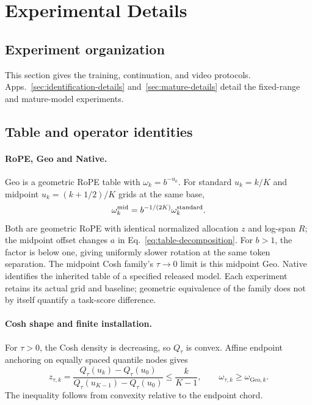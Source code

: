 \section{Experimental Details}
\label{sec:experiment-details}

\FloatBarrier
\subsection{Experiment organization}

This section gives the training, continuation, and video protocols.
Apps.~\ref{sec:identification-details} and~\ref{sec:mature-details} detail
the fixed-range and mature-model experiments.

\subsection{Table and operator identities}
\label{sec:table-identities}

\paragraph{RoPE, Geo and Native.}
Geo is a geometric RoPE table with $\omega_k=b^{-u_k}$. For standard $u_k=k/K$ and midpoint $u_k=(k+1/2)/K$ grids at the same base,
\[
\omega_k^{\rm mid}=b^{-1/(2K)}\omega_k^{\rm standard}.
\]
Both are geometric RoPE with identical normalized allocation $z$ and log-span $R$; the midpoint offset changes $a$ in Eq.~\eqref{eq:table-decomposition}. For $b>1$, the factor is below one, giving uniformly slower rotation at the same token separation. The midpoint Cosh family's $\tau\to0$ limit is this midpoint Geo. Native identifies the inherited table of a specified released model. Each experiment retains its actual grid and baseline; geometric equivalence of the family does not by itself quantify a task-score difference.

\paragraph{Cosh shape and finite installation.}
For $\tau>0$, the Cosh density is decreasing, so $Q_\tau$ is convex. Affine
endpoint anchoring on equally spaced quantile nodes gives
\begin{equation}
z_{\tau,k}=\frac{Q_\tau(u_k)-Q_\tau(u_0)}{Q_\tau(u_{K-1})-Q_\tau(u_0)}
\le\frac{k}{K-1},\qquad\omega_{\tau,k}\ge\omega_{\mathrm{Geo},k}.
\label{eq:anchored-cosh-order}
\end{equation}
The inequality follows from convexity relative to the endpoint chord.

